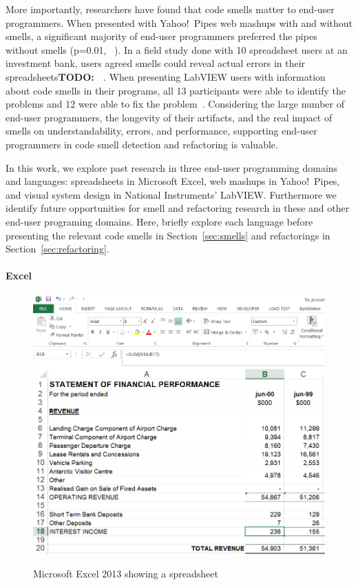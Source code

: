 \documentclass[10pt,conference,compsocconf]{IEEEtran}
\newcommand{\todo}[1]{\textbf{TODO: #1}}
\begin{document}
More importantly, researchers have  found that code smells matter to end-user programmers. When presented with Yahoo!\ Pipes web mashups with and without smells, a significant majority of end-user programmers preferred the pipes without smells (p=0.01, ~\cite{StoleeTSE2013}). In a field study done with 10 spreadsheet users at an investment bank, users agreed smells could reveal actual errors in their spreadsheets\todo{~\cite{}}. When presenting LabVIEW users with information about code smells in their programs, all 13 participants were able to identify the problems and 12 were able to fix the problem~\cite{chambers2013smell}.
Considering the large number of end-user programmers, the longevity of their artifacts, and the real impact of smells on understandability, errors, and performance, supporting end-user programmers in code smell detection and refactoring is valuable. 

In this work, we explore past research in three end-user programming domains and languages: spreadsheets in Microsoft Excel, web mashups in Yahoo!\ Pipes, and visual system design in National Instruments' LabVIEW. Furthermore we identify future opportunities for smell and refactoring research in these and other end-user programing domains. Here, briefly explore each language  before presenting the relevant code smells in  Section~\ref{sec:smells} and refactorings in Section~\ref{sec:refactoring}.

\paragraph{Excel}

\begin{figure}
\caption{Microsoft Excel 2013 showing a spreadsheet}
\centering
\includegraphics[width=\columnwidth]{excel-2}
\label{fig:spreadsheetexample}
\end{figure}
\end{document}
